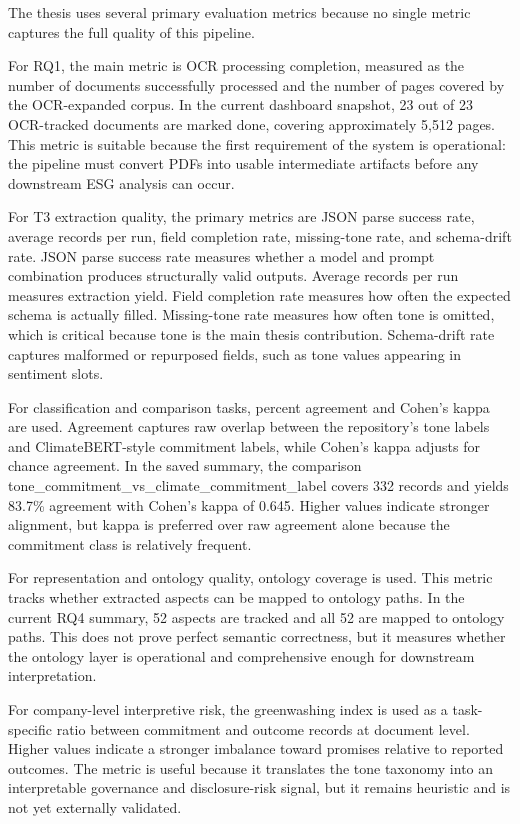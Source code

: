 The thesis uses several primary evaluation metrics because no single metric captures the full quality of this pipeline.

For RQ1, the main metric is OCR processing completion, measured as the number of documents successfully processed and the number of pages covered by the OCR-expanded corpus. In the current dashboard snapshot, 23 out of 23 OCR-tracked documents are marked done, covering approximately 5,512 pages. This metric is suitable because the first requirement of the system is operational: the pipeline must convert PDFs into usable intermediate artifacts before any downstream ESG analysis can occur.

For T3 extraction quality, the primary metrics are JSON parse success rate, average records per run, field completion rate, missing-tone rate, and schema-drift rate. JSON parse success rate measures whether a model and prompt combination produces structurally valid outputs. Average records per run measures extraction yield. Field completion rate measures how often the expected schema is actually filled. Missing-tone rate measures how often tone is omitted, which is critical because tone is the main thesis contribution. Schema-drift rate captures malformed or repurposed fields, such as tone values appearing in sentiment slots.

For classification and comparison tasks, percent agreement and Cohen’s kappa are used. Agreement captures raw overlap between the repository’s tone labels and ClimateBERT-style commitment labels, while Cohen’s kappa adjusts for chance agreement. In the saved summary, the comparison tone\_commitment\_vs\_climate\_commitment\_label covers 332 records and yields 83.7\% agreement with Cohen’s kappa of 0.645. Higher values indicate stronger alignment, but kappa is preferred over raw agreement alone because the commitment class is relatively frequent.

For representation and ontology quality, ontology coverage is used. This metric tracks whether extracted aspects can be mapped to ontology paths. In the current RQ4 summary, 52 aspects are tracked and all 52 are mapped to ontology paths. This does not prove perfect semantic correctness, but it measures whether the ontology layer is operational and comprehensive enough for downstream interpretation.

For company-level interpretive risk, the greenwashing index is used as a task-specific ratio between commitment and outcome records at document level. Higher values indicate a stronger imbalance toward promises relative to reported outcomes. The metric is useful because it translates the tone taxonomy into an interpretable governance and disclosure-risk signal, but it remains heuristic and is not yet externally validated.
